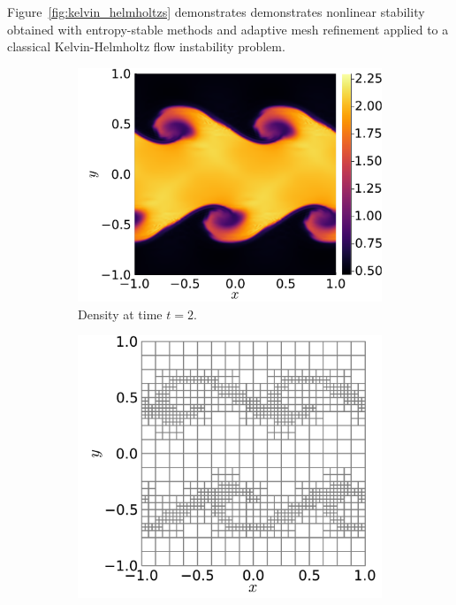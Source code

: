 \documentclass{juliacon}
\begin{document}
Figure~\ref{fig:kelvin_helmholtzs} demonstrates demonstrates nonlinear stability
obtained with entropy-stable methods and adaptive mesh refinement applied to a
classical Kelvin-Helmholtz flow instability problem.
\begin{figure}[!h]
  \begin{subfigure}{0.53\linewidth}
    \includegraphics[width=\textwidth]{../figures/kelvin_helmholtz_density_t2}
    \caption{Density at time $t = 2$.}
  \end{subfigure}%
  \hspace*{\fill}
  \begin{subfigure}{0.47\linewidth}
    \includegraphics[width=\textwidth]{../figures/kelvin_helmholtz_mesh_t2}

\end{subfigure}
\end{figure}
\end{document}
